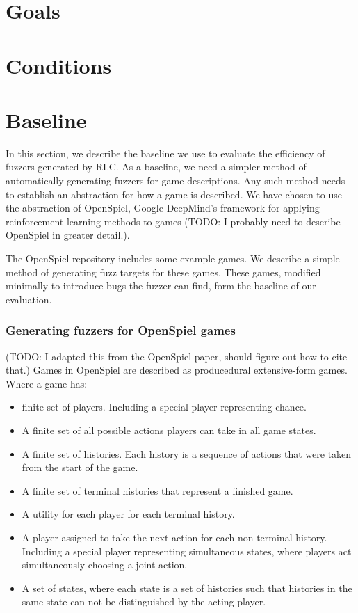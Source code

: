 \section{Goals}

\section{Conditions}

\section{Baseline}
In this section, we describe the baseline we use to evaluate the efficiency of fuzzers generated by RLC.
As a baseline, we need a simpler method of automatically generating fuzzers for game descriptions. Any such method
needs to establish an abstraction for how a game is described. We have chosen to use the abstraction of OpenSpiel, 
Google DeepMind's framework for applying reinforcement learning methods to games (TODO: I probably need to describe
 OpenSpiel in greater detail.).

The OpenSpiel repository includes some example games. We describe a simple method of generating fuzz targets for these games.
These games, modified minimally to introduce bugs the fuzzer can find, form the baseline of our evaluation.

\subsubsection{Generating fuzzers for OpenSpiel games}
(TODO: I adapted this from the OpenSpiel paper, should figure out how to cite that.)
Games in OpenSpiel are described as producedural extensive-form games. Where a game has:
\begin{itemize}
    \item finite set of players. Including a special player representing chance.
    \item A finite set of all possible actions players can take in all game states.
    \item A finite set of histories. Each history is a sequence of actions that were taken from the start
    of the game.
    \item A finite set of terminal histories that represent a finished game.
    \item A utility for each player for each terminal history.
    \item A player assigned to take the next action for each non-terminal history. Including a special player representing simultaneous states, 
        where players act simultaneously choosing a joint action.
    \item A set of states, where each state is a set of histories such that histories in the same state can not be distinguished by the acting player.
\end{itemize}

